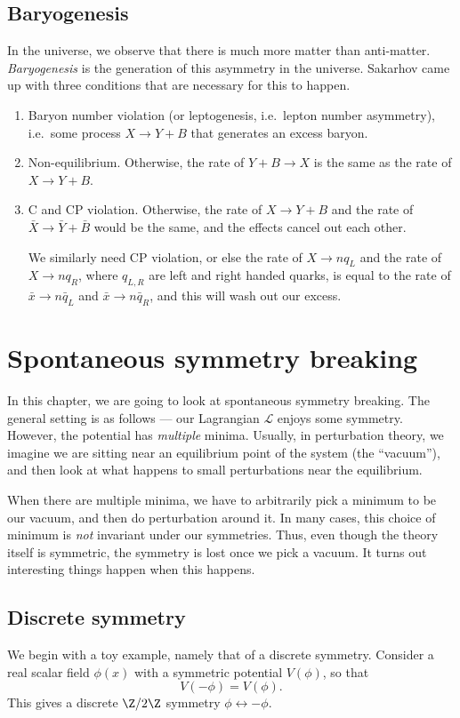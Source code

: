 \documentclass[a4paper]{article}
\begin{document}
\subsection{Baryogenesis}
In the universe, we observe that there is much more matter than anti-matter. \emph{Baryogenesis} is the generation of this asymmetry in the universe. Sakarhov came up with three conditions that are necessary for this to happen.
\begin{enumerate}
  \item Baryon number violation (or leptogenesis, i.e.\ lepton number asymmetry), i.e.\ some process $X \to Y + B$ that generates an excess baryon.
  \item Non-equilibrium. Otherwise, the rate of $Y + B \to X$ is the same as the rate of $X \to Y + B$.
  \item C and CP violation. Otherwise, the rate of $X \to Y + B$ and the rate of $\bar{X} \to \bar{Y} + \bar{B}$ would be the same, and the effects cancel out each other.

    We similarly need CP violation, or else the rate of $X \to nq_L$ and the rate of $X \to n q_R$, where $q_{L, R}$ are left and right handed quarks, is equal to the rate of $\bar{x} \to n \bar{q}_L$ and $\bar{x} \to n\bar{q}_R$, and this will wash out our excess.
\end{enumerate}

\section{Spontaneous symmetry breaking}
In this chapter, we are going to look at spontaneous symmetry breaking. The general setting is as follows --- our Lagrangian $\mathcal{L}$ enjoys some symmetry. However, the potential has \emph{multiple} minima. Usually, in perturbation theory, we imagine we are sitting near an equilibrium point of the system (the ``vacuum''), and then look at what happens to small perturbations near the equilibrium.

When there are multiple minima, we have to arbitrarily pick a minimum to be our vacuum, and then do perturbation around it. In many cases, this choice of minimum is \emph{not} invariant under our symmetries. Thus, even though the theory itself is symmetric, the symmetry is lost once we pick a vacuum. It turns out interesting things happen when this happens.

\subsection{Discrete symmetry}
We begin with a toy example, namely that of a discrete symmetry. Consider a real scalar field $\phi(x)$ with a symmetric potential $V(\phi)$, so that
\[
  V(-\phi) = V(\phi).
\]
This gives a discrete $\Z/2\Z$ symmetry $\phi \leftrightarrow -\phi$.
\end{document}
